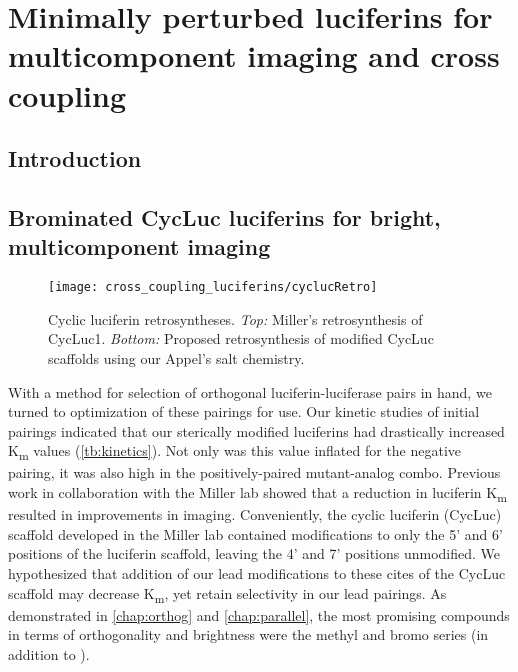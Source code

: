 
\chapter{Minimally perturbed luciferins for multicomponent imaging and cross coupling}
\section{Introduction}


\section{Brominated CycLuc luciferins for bright, multicomponent imaging}

\begin{figure}[htbp]
\texttt{[image: cross\_coupling\_luciferins/cyclucRetro]} %
\centering
\caption[Cyclic luciferin retrosyntheses.]{
Cyclic luciferin retrosyntheses. \textit{Top:} Miller's retrosynthesis of CycLuc1. \textit{Bottom:} Proposed retrosynthesis of modified CycLuc scaffolds using our Appel's salt chemistry.
}
  \label{fig:cyclucRetro}
\end{figure}
With a method for selection of orthogonal luciferin-luciferase pairs in hand, we turned to optimization of these pairings for \invivo{} use. Our kinetic studies of initial pairings indicated that our sterically modified luciferins had drastically increased K\textsubscript{m} values (\autoref{tb:kinetics}). Not only was this value inflated for the negative pairing, it was also high in the positively-paired mutant-analog combo. Previous work in collaboration with the Miller lab showed that a reduction in luciferin K\textsubscript{m} resulted in improvements in \invivo{} imaging.\cite{Evanssyntheticluciferinimproves2014}
Conveniently, the cyclic luciferin (CycLuc) scaffold developed in the Miller lab contained modifications to only the 5' and 6' positions of the luciferin scaffold, leaving the 4' and 7' positions unmodified.\cite{ReddyRobustlightemission2010,MoffordAminoluciferinsExtendFirefly2014}
We hypothesized that addition of our lead modifications to these cites of the CycLuc scaffold may decrease K\textsubscript{m}, yet retain selectivity in our lead pairings.
As demonstrated in \autoref{chap:orthog} and \autoref{chap:parallel}, the most promising compounds in terms of orthogonality and brightness were the methyl and bromo series (in addition to \dluc).
